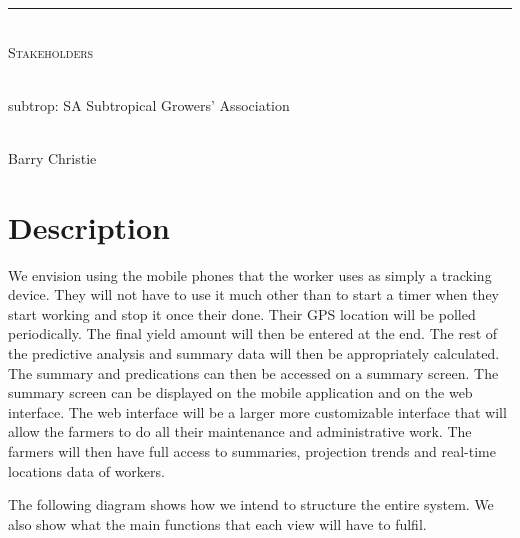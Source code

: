 \documentclass[12pt]{article}
\begin{document}
\begin{titlepage}
\begin{center}
		\rule{\linewidth}{0.5mm} \\[1cm] 
		\textsc{\Large Stakeholders}\\[1cm]	
		
		\begin{minipage}{0.4\textwidth}
			\begin{flushleft} \large
				\emph{} \\
				subtrop: SA Subtropical Growers' Association
			\end{flushleft}
		\end{minipage}
		\begin{minipage}{0.4\textwidth}
			\begin{flushright} \large
				\emph{} \\
				Barry Christie
			\end{flushright}
		\end{minipage}

		
	\end{center}
\end{titlepage}
	
    \newpage
	\tableofcontents
	\newpage
	
	\section{Description}
	We envision using the mobile phones that the worker uses as simply a tracking device. They will not have to use it much other than to start a timer when they start working and stop it once their done. Their GPS location will be polled periodically. The final yield amount will then be entered at the end. The rest of the predictive analysis and summary data will then be appropriately calculated. The summary and predications can then be accessed on a summary screen. The summary screen can be displayed on the mobile application and on the web interface. The web interface will be a larger more customizable interface that will allow the farmers to do all their maintenance and administrative work. The farmers will then have full access to summaries, projection trends and real-time locations data of workers.
	
	The following diagram shows how we intend to structure the entire system. We also show what the main functions that each view will have to fulfil.
	
\end{document}
